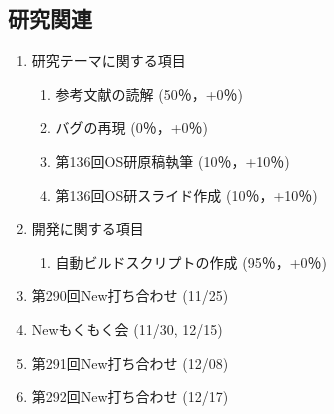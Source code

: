 \documentclass[fleqn, 14pt]{extarticle}
\begin{document}
    \subsection{研究関連}
    \label{sec-2-1}
    \begin{enumerate}

        \item 研究テーマに関する項目
            \hfill
            \label{enum-research1}
            \begin{enumerate}

                \item 参考文献の読解
                    \hfill
                    \label{enum-1-A}
                    (50％，+0％)

                \item バグの再現
                    \hfill
                    \label{enum-1-B}
                    (0％，+0％)

                \item 第136回OS研原稿執筆
                    \hfill
                    \label{enum-1-C}
                    (10％，+10％)

                \item 第136回OS研スライド作成
                    \hfill
                    \label{enum-1-D}
                    (10％，+10％)

            \end{enumerate}

        \item 開発に関する項目
            \hfill
            \label{enum-research2}
            \begin{enumerate}

                \item 自動ビルドスクリプトの作成
                    \hfill
                    \label{enum-2-A}
                    (95％，+0％)

            \end{enumerate}

        \item 第290回New打ち合わせ
            \hfill
            \label{enum-research3}
            (11/25)

        \item Newもくもく会
            \hfill
            \label{enum-research3}
            (11/30, 12/15)

        \item 第291回New打ち合わせ
            \hfill
            \label{enum-research3}
            (12/08)

        \item 第292回New打ち合わせ
            \hfill
            \label{enum-research3}
            (12/17)

    \end{enumerate}
\end{document}

